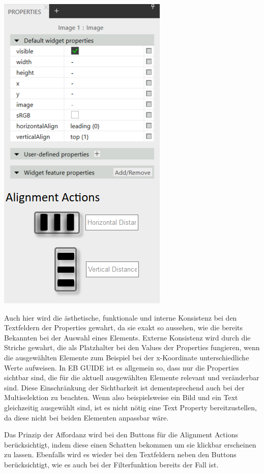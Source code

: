 \begin{center}
  \includegraphics[scale=0.8]{figures/Mehrfachselektion_Adaption02.png}
  \label{fig:Mehrfachselektion_Adaption}
\end{center}

Auch hier wird die ästhetische, funktionale und interne Konsistenz bei den Textfeldern der Properties gewahrt, da sie exakt so aussehen, wie die bereits Bekannten bei der Auswahl eines Elements.
Externe Konsistenz wird durch die Striche gewahrt, die als Platzhalter bei den Values der Properties fungieren, wenn die ausgewählten Elemente zum Beispiel bei der x-Koordinate unterschiedliche Werte aufweisen.
In EB GUIDE ist es allgemein so, dass nur die Properties sichtbar sind, die für die aktuell ausgewählten Elemente relevant und veränderbar sind.
Diese Einschränkung der Sichtbarkeit ist dementsprechend auch bei der Multiselektion zu beachten.
Wenn also beispielsweise ein Bild und ein Text gleichzeitig ausgewählt sind, ist es nicht nötig eine Text Property bereitzustellen, da diese nicht bei beiden Elementen anpassbar wäre.

Das Prinzip der Affordanz wird bei den Buttons für die Alignment Actions berücksichtigt, indem diese einen Schatten bekommen um sie klickbar erscheinen zu lassen.
Ebenfalls wird es wieder bei den Textfeldern neben den Buttons berücksichtigt, wie es auch bei der Filterfunktion bereits der Fall ist.

